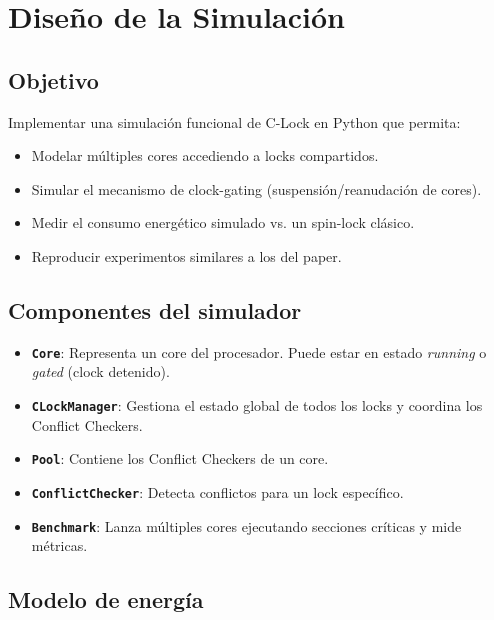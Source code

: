 
\section{Diseño de la Simulación}

\subsection{Objetivo}

Implementar una simulación funcional de C-Lock en Python que permita:
\begin{itemize}
    \item Modelar múltiples cores accediendo a locks compartidos.
    \item Simular el mecanismo de clock-gating (suspensión/reanudación de cores).
    \item Medir el consumo energético simulado vs. un spin-lock clásico.
    \item Reproducir experimentos similares a los del paper.
\end{itemize}

\subsection{Componentes del simulador}

\begin{itemize}
    \item \textbf{\texttt{Core}}: Representa un core del procesador. Puede estar en estado
          \textit{running} o \textit{gated} (clock detenido).
    \item \textbf{\texttt{CLockManager}}: Gestiona el estado global de todos los locks y
          coordina los Conflict Checkers.
    \item \textbf{\texttt{Pool}}: Contiene los Conflict Checkers de un core.
    \item \textbf{\texttt{ConflictChecker}}: Detecta conflictos para un lock específico.
    \item \textbf{\texttt{Benchmark}}: Lanza múltiples cores ejecutando secciones críticas
          y mide métricas.
\end{itemize}

\subsection{Modelo de energía}


